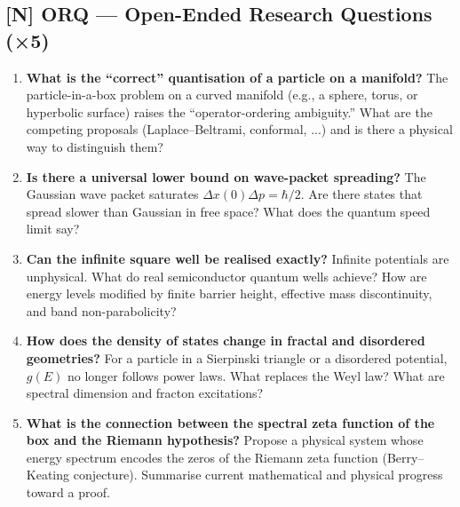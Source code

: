 \subsection*{[N] ORQ — Open-Ended Research Questions (×5)}
\begin{tcolorbox}[researchbox, title={ORQ · L01 · Tiers 4–5 · 10–20 hrs each}]
\begin{enumerate}[label=\textbf{O\arabic*.}]
  \item \textbf{What is the ``correct'' quantisation of a particle on a manifold?}
    The particle-in-a-box problem on a curved manifold (e.g., a sphere, torus, or hyperbolic
    surface) raises the ``operator-ordering ambiguity.'' What are the competing proposals
    (Laplace–Beltrami, conformal, ...) and is there a physical way to distinguish them?
  \item \textbf{Is there a universal lower bound on wave-packet spreading?}
    The Gaussian wave packet saturates $\Delta x(0)\Delta p = \hbar/2$. Are there states
    that spread slower than Gaussian in free space? What does the quantum speed limit say?
  \item \textbf{Can the infinite square well be realised exactly?}
    Infinite potentials are unphysical. What do real semiconductor quantum wells achieve?
    How are energy levels modified by finite barrier height, effective mass discontinuity,
    and band non-parabolicity?
  \item \textbf{How does the density of states change in fractal and disordered geometries?}
    For a particle in a Sierpinski triangle or a disordered potential, $g(E)$ no longer
    follows power laws. What replaces the Weyl law? What are spectral dimension and fracton
    excitations?
  \item \textbf{What is the connection between the spectral zeta function of the box and the Riemann hypothesis?}
    Propose a physical system whose energy spectrum encodes the zeros of the Riemann zeta
    function (Berry–Keating conjecture). Summarise current mathematical and physical
    progress toward a proof.
\end{enumerate}
\end{tcolorbox}

